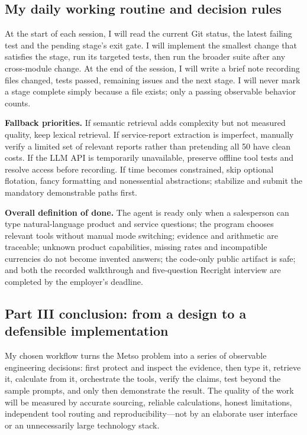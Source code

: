 \documentclass[11pt,a4paper]{article}
\begin{document}
\subsection{My daily working routine and decision rules}
At the start of each session, I will read the current Git status, the latest failing test and the pending stage's exit gate. I will implement the smallest change that satisfies the stage, run its targeted tests, then run the broader suite after any cross-module change. At the end of the session, I will write a brief note recording files changed, tests passed, remaining issues and the next stage. I will never mark a stage complete simply because a file exists; only a passing observable behavior counts.

\textbf{Fallback priorities.} If semantic retrieval adds complexity but not measured quality, keep lexical retrieval. If service-report extraction is imperfect, manually verify a limited set of relevant reports rather than pretending all 50 have clean costs. If the LLM API is temporarily unavailable, preserve offline tool tests and resolve access before recording. If time becomes constrained, skip optional flotation, fancy formatting and nonessential abstractions; stabilize and submit the mandatory demonstrable paths first.

\begin{keybox}
\textbf{Overall definition of done.} The agent is ready only when a salesperson can type natural-language product and service questions; the program chooses relevant tools without manual mode switching; evidence and arithmetic are traceable; unknown product capabilities, missing rates and incompatible currencies do not become invented answers; the code-only public artifact is safe; and both the recorded walkthrough and five-question Recright interview are completed by the employer's deadline.
\end{keybox}

\subsection{Part III conclusion: from a design to a defensible implementation}
My chosen workflow turns the Metso problem into a series of observable engineering decisions: first protect and inspect the evidence, then type it, retrieve it, calculate from it, orchestrate the tools, verify the claims, test beyond the sample prompts, and only then demonstrate the result. The quality of the work will be measured by accurate sourcing, reliable calculations, honest limitations, independent tool routing and reproducibility---not by an elaborate user interface or an unnecessarily large technology stack.
\end{document}
